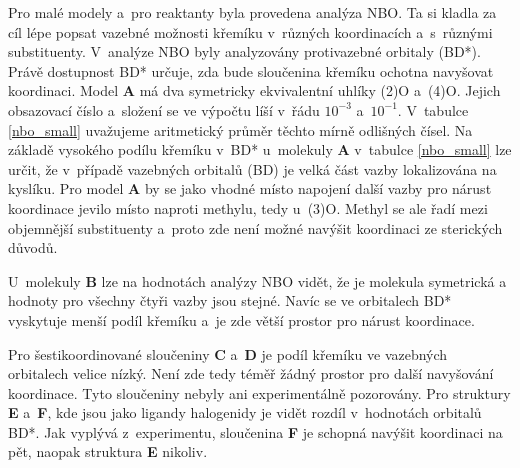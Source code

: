 \documentclass[
digital, %
table,   %
nolof,     %
nolot,     %
oneside,
]{fithesis3}
\begin{document}
Pro malé modely a~pro reaktanty byla provedena analýza NBO. Ta si kladla za cíl lépe popsat vazebné možnosti křemíku v~různých koordinacích a~s~různými substituenty. V~analýze NBO byly analyzovány protivazebné orbitaly (BD*). Právě dostupnost BD* určuje, zda bude sloučenina křemíku ochotna navyšovat koordinaci. Model \textbf{A} má dva symetricky ekvivalentní uhlíky (2)O a~(4)O. Jejich obsazovací číslo a~složení se ve výpočtu líší v~řádu $10^{-3}$ a~$10^{-1}$. V~tabulce \ref{nbo_small} uvažujeme aritmetický průměr těchto mírně odlišných čísel. Na základě vysokého podílu křemíku v~BD* u~molekuly \textbf{A} v~tabulce \ref{nbo_small} lze určit, že v~případě vazebných orbitalů (BD) je velká část vazby lokalizována na kyslíku. Pro model \textbf{A} by se jako vhodné místo napojení další vazby pro nárust koordinace jevilo místo  naproti methylu, tedy u~(3)O. Methyl se ale řadí mezi objemnější substituenty a~proto zde není možné navýšit koordinaci ze sterických důvodů.

 U~molekuly \textbf{B} lze na hodnotách analýzy NBO vidět, že je molekula symetrická a hodnoty pro všechny čtyři vazby jsou stejné. Navíc se ve orbitalech BD* vyskytuje menší podíl křemíku a~je zde větší prostor pro nárust koordinace.

Pro šestikoordinované sloučeniny \textbf{C} a~\textbf{D} je podíl křemíku ve vazebných orbitalech velice nízký. Není zde tedy téměř žádný prostor pro další navyšování koordinace. Tyto sloučeniny nebyly ani experimentálně pozorovány. Pro struktury \textbf{E} a~\textbf{F}, kde jsou jako ligandy halogenidy je vidět rozdíl v~hodnotách orbitalů BD*. Jak vyplývá z~experimentu, sloučenina \textbf{F} je schopná navýšit koordinaci na pět, naopak struktura \textbf{E} nikoliv.
\end{document}
